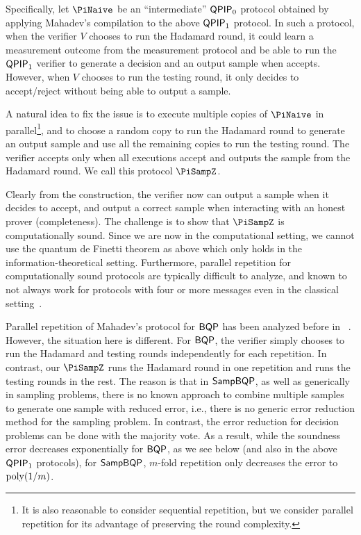Specifically, let $\PiNaive$ be an ``intermediate'' $\operatorname{\mathsf{QPIP}}_0$ protocol obtained by applying Mahadev's compilation to the above $\operatorname{\mathsf{QPIP}}_1$ protocol. In such a protocol, when the verifier $V$ chooses to run the Hadamard round, it could learn a measurement outcome from the measurement protocol and be able to run the $\operatorname{\mathsf{QPIP}}_1$ verifier to generate a decision and an output sample when accepts. However, when  $V$ chooses to run the testing round, it only decides to accept/reject without being able to output a sample. 

 A natural idea to fix the issue is to execute multiple copies of $\PiNaive$ in parallel\footnote{It is also reasonable to consider sequential repetition, but we consider parallel repetition for its advantage of preserving the round complexity.}, and to choose a random copy to run the Hadamard round to generate an output sample and use all the remaining copies to run the testing round. The verifier accepts only when all executions accept and outputs the sample from the Hadamard round. We call this protocol $\PiSampZ$.

Clearly from the construction, the verifier now can output a sample when it decides to accept, and output a correct sample when interacting with an honest prover (completeness). The challenge is to show that $\PiSampZ$ is computationally sound. Since we are now in the computational setting, we cannot use the quantum de Finetti theorem as above which only holds in the information-theoretical setting. Furthermore, parallel repetition for computationally sound protocols are typically difficult to analyze, and known to not always work for protocols with four or more messages even in the classical setting~\cite{BIN97,PW12}.


 Parallel repetition of Mahadev's protocol for $\operatorname{\mathsf{BQP}}$ has been analyzed before in ~\cite{arXiv:ChiaChungYam19, arXiv:AlaChiHun19}. However, the situation here is different. 
 For $\operatorname{\mathsf{BQP}}$, the verifier simply chooses to run the Hadamard and testing rounds independently for each repetition.
 In contrast, our $\PiSampZ$ runs the Hadamard round in one repetition and runs the testing rounds in the rest. The reason is that in $\operatorname{\mathsf{SampBQP}}$, as well as generically in sampling problems, there is no known approach to combine multiple samples to generate one sample with reduced error, i.e., there is no generic error reduction method for the sampling problem. 
In contrast, the error reduction for decision problems can be done with the majority vote. 
As a result, while the soundness error decreases exponentially for $\operatorname{\mathsf{BQP}}$, as we see below (and also in the above $\operatorname{\mathsf{QPIP}}_1$ protocols), for $\operatorname{\mathsf{SampBQP}}$, $m$-fold repetition only decreases the error to $\operatorname*{\operatorname{poly}}(1/m)$. 



